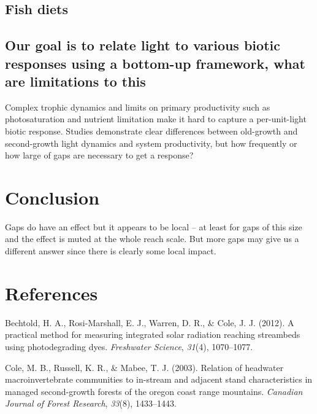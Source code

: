 \documentclass[double,12pt]{beavtex}
\begin{document}
  \section*{Fish diets}\label{fish-diets}
  
  \section*{Our goal is to relate light to various biotic responses using
  a bottom-up framework, what are limitations to
  this}\label{our-goal-is-to-relate-light-to-various-biotic-responses-using-a-bottom-up-framework-what-are-limitations-to-this}
  
  Complex trophic dynamics and limits on primary productivity such as
  photosaturation and nutrient limitation make it hard to capture a
  per-unit-light biotic response. Studies demonstrate clear differences
  between old-growth and second-growth light dynamics and system
  productivity, but how frequently or how large of gaps are necessary to
  get a response?
  
  \chapter*{Conclusion}\label{conclusion}
  
  Gaps do have an effect but it appears to be local -- at least for gaps
  of this size and the effect is muted at the whole reach scale. But more
  gaps may give us a different answer since there is clearly some local
  impact.
  
  \pagebreak
  
  \chapter*{References}\label{references}
  
  \hypertarget{refs}{}
  \hypertarget{ref-Bechtold2012}{}
  Bechtold, H. A., Rosi-Marshall, E. J., Warren, D. R., \& Cole, J. J.
  (2012). A practical method for measuring integrated solar radiation
  reaching streambeds using photodegrading dyes. \emph{Freshwater
  Science}, \emph{31}(4), 1070--1077.
  
  \hypertarget{ref-Cole2003}{}
  Cole, M. B., Russell, K. R., \& Mabee, T. J. (2003). Relation of
  headwater macroinvertebrate communities to in-stream and adjacent stand
  characteristics in managed second-growth forests of the oregon coast
  range mountains. \emph{Canadian Journal of Forest Research},
  \emph{33}(8), 1433--1443.
  
\end{document}
